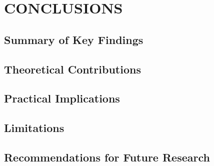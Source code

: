 
\chapter{CONCLUSIONS}\label{chap:conclusions}


\section{Summary of Key Findings}\label{sec:summary}

\section{Theoretical Contributions}\label{sec:contributions}

\section{Practical Implications}\label{sec:implications}

\section{Limitations}\label{sec:limitations}

\section{Recommendations for Future Research}\label{sec:future_research}
